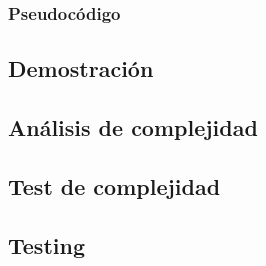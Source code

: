 \subsubsection{Pseudoc\'odigo}

\subsection{Demostraci\'on} %

\subsection{An\'alisis de complejidad}

\subsection{Test de complejidad}

\subsection{Testing}
